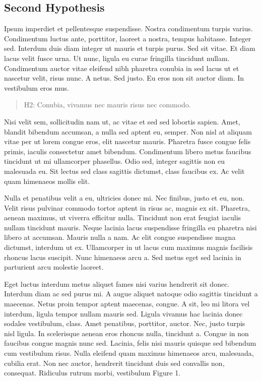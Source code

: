 \documentclass[
  12,
]{article}
\begin{document}
\hypertarget{second-hypothesis}{%
\subsection{Second Hypothesis}\label{second-hypothesis}}

Ipsum imperdiet et pellentesque suspendisse. Nostra condimentum turpis
varius. Condimentum luctus ante, porttitor, laoreet a nostra, tempus
habitasse. Integer sed. Interdum duis diam integer ut mauris et turpis
purus. Sed sit vitae. Et diam lacus velit fusce urna. Ut nunc, ligula eu
curae fringilla tincidunt nullam. Condimentum auctor vitae eleifend nibh
pharetra conubia in sed lacus ut et nascetur velit, risus nunc. A netus.
Sed justo. Eu eros non sit auctor diam. In vestibulum eros mus.

\begin{quote}
H2: Conubia, vivamus nec mauris risus nec commodo.
\end{quote}

Nisi velit sem, sollicitudin nam ut, ac vitae et sed sed lobortis
sapien. Amet, blandit bibendum accumsan, a nulla sed aptent eu, semper.
Non nisl at aliquam vitae per ut lorem congue eros, elit nascetur
mauris. Pharetra fusce congue felis primis, iaculis consectetur amet
bibendum. Condimentum libero metus faucibus tincidunt ut mi ullamcorper
phasellus. Odio sed, integer sagittis non eu malesuada eu. Sit lectus
sed class sagittis dictumst, class faucibus ex. Ac velit quam himenaeos
mollis elit.

Nulla et penatibus velit a eu, ultricies donec mi. Nec finibus, justo et
eu, non. Velit risus pulvinar commodo tortor aptent in risus ac, magnis
ex sit. Pharetra, aenean maximus, ut viverra efficitur nulla. Tincidunt
non erat feugiat iaculis nullam tincidunt mauris. Neque lacinia lacus
suspendisse fringilla eu pharetra nisi libero at accumsan. Mauris nulla
a nam. Ac elit congue suspendisse magna dictumst, interdum ut ex.
Ullamcorper in ut lacus cum maximus magnis facilisis rhoncus lacus
suscipit. Nunc himenaeos arcu a. Sed metus eget sed lacinia in
parturient arcu molestie laoreet.

Eget luctus interdum metus aliquet fames nisi varius hendrerit sit
donec. Interdum diam ac sed purus mi. A augue aliquet natoque odio
sagittis tincidunt a maecenas. Netus proin tempor aptent maecenas,
congue. A sit, leo mi litora vel interdum, ligula tempor nullam mauris
sed. Ligula vivamus hac lacinia donec sodales vestibulum, class. Amet
penatibus, porttitor, auctor. Nec, justo turpis nisl ligula. In
scelerisque aenean eros rhoncus nulla, tincidunt a. Congue in non
faucibus congue magnis nunc sed. Lacinia, felis nisi mauris quisque sed
bibendum cum vestibulum risus. Nulla eleifend quam maximus himenaeos
arcu, malesuada, cubilia erat. Non nec auctor, hendrerit tincidunt duis
sed convallis non, consequat. Ridiculus rutrum morbi, vestibulum Figure
1.
\end{document}
